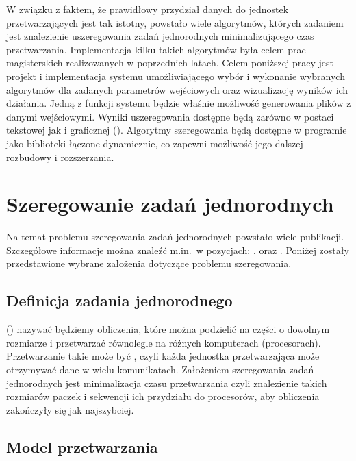 W związku z faktem, że prawidłowy przydział danych do jednostek przetwarzających jest tak istotny, powstało wiele algorytmów, których zadaniem 
jest znalezienie uszeregowania zadań jednorodnych minimalizującego czas przetwarzania. Implementacja kilku takich algorytmów była celem prac 
magisterskich realizowanych w poprzednich latach. Celem poniższej pracy jest projekt i implementacja systemu umożliwiającego wybór i wykonanie 
wybranych algorytmów dla zadanych parametrów wejściowych oraz wizualizację wyników ich działania. Jedną z funkcji systemu będzie właśnie możliwość 
generowania plików z danymi wejściowymi. Wyniki uszeregowania dostępne będą zarówno w postaci tekstowej jak i graficznej (). 
Algorytmy szeregowania będą dostępne w programie jako biblioteki łączone dynamicznie, co zapewni możliwość jego dalszej rozbudowy i rozszerzania.


\chapter{Szeregowanie zadań jednorodnych}

Na temat problemu szeregowania zadań jednorodnych powstało wiele publikacji. Szczegółowe informacje można znaleźć m.in.~w pozycjach: \cite{znPSl96}, 
\cite{robertazzi} oraz \cite{veeravalli}. Poniżej zostały przedstawione wybrane założenia dotyczące problemu szeregowania.

\section{Definicja zadania jednorodnego}

 () nazywać będziemy obliczenia, które można podzielić na części o dowolnym rozmiarze i 
przetwarzać równolegle
na różnych komputerach (procesorach). Przetwarzanie takie może być , czyli każda jednostka przetwarzająca może otrzymywać dane w wielu 
komunikatach. Założeniem szeregowania zadań jednorodnych jest minimalizacja czasu przetwarzania czyli znalezienie takich rozmiarów paczek 
i sekwencji ich przydziału do procesorów, aby obliczenia zakończyły się jak najszybciej.

\section{Model przetwarzania}\label{model_przetwarzania}

